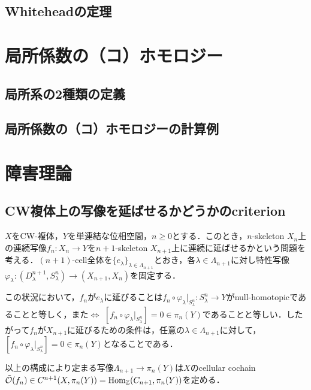 \documentclass[a4paper,11pt]{jsarticle}
\theoremstyle{definition}
\DeclareMathOperator{\Hom}{\mathrm{Hom}}
\begin{document}
\subsection{Whiteheadの定理}
\section{局所係数の（コ）ホモロジー}
\subsection{局所系の2種類の定義}
\subsection{局所係数の（コ）ホモロジーの計算例}
\section{障害理論}
\subsection{CW複体上の写像を延ばせるかどうかのcriterion}
$X$をCW-複体，$Y$を単連結な位相空間，$n\ge 0$とする．このとき，$n$-skeleton $X_n$上の連続写像$f_n\colon X_n\to Y$を$n+1$-skeleton $X_{n+1}$上に連続に延ばせるかという問題を考える．$(n+1)$-cell全体を$\{e_{\lambda}\}_{\lambda\in \Lambda_{n+1}}$とおき，各$\lambda\in\Lambda_{n+1}$に対し特性写像$\varphi_\lambda\colon (D^{n+1}_\lambda,S^n_\lambda)\to (X_{n+1},X_n)$を固定する．

この状況において，$f_n$が$e_\lambda$に延びることは$f_n\circ\varphi_\lambda|_{S^n_\lambda}\colon S^n_\lambda\to Y$がnull-homotopicであることと等しく，また$\Leftrightarrow$ $[f_n\circ \varphi_\lambda|_{S^n_\lambda}]=0\in \pi_n(Y)$であることと等しい．したがって$f_n$が$X_{n+1}$に延びるための条件は，任意の$\lambda\in\Lambda_{n+1}$に対して，$[f_n\circ \varphi_\lambda|_{S^n_\lambda}]=0\in \pi_n(Y)$となることである．

以上の構成により定まる写像$\Lambda_{n+1}\to \pi_n(Y)$は$X$のcellular cochain $\Tilde{\mathcal{O}}(f_n)\in C^{n+1}(X,\pi_n(Y))=\Hom_\mathbb{Z}(C_{n+1},\pi_n(Y))$を定める．
\end{document}

